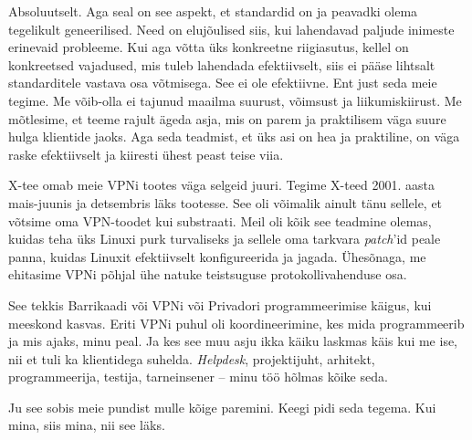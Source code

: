 
Absoluutselt. Aga seal on see aspekt, et standardid on ja peavadki olema 
tegelikult geneerilised. Need on elujõulised siis, kui lahendavad 
paljude inimeste erinevaid probleeme. Kui aga võtta üks konkreetne riigiasutus, kellel on konkreetsed vajadused, mis tuleb 
lahendada efektiivselt, siis ei pääse lihtsalt 
standarditele vastava osa võtmisega. See ei ole efektiivne. Ent
just seda meie tegime. Me 
võib-olla ei tajunud maailma suurust, võimsust ja liikumiskiirust. 
Me mõtlesime, et teeme rajult 
ägeda asja, mis on parem ja praktilisem väga suure 
hulga klientide jaoks. Aga seda teadmist, et üks asi on hea ja praktiline,  
on väga raske efektiivselt ja kiiresti ühest peast teise viia.  


X-tee omab meie VPNi tootes väga selgeid 
juuri. Tegime X-teed 2001. aasta mais-juunis ja detsembris läks tootesse. 
See oli võimalik ainult tänu sellele, et võtsime oma VPN-toodet kui 
substraati. Meil oli kõik see teadmine olemas, kuidas teha üks Linuxi purk 
turvaliseks ja sellele oma tarkvara 
\emph{patch}'id peale panna, kuidas Linuxit efektiivselt konfigureerida ja jagada. Ühesõnaga, me ehitasime VPNi põhjal ühe natuke teistsuguse 
protokollivahenduse osa. 


See tekkis Barrikaadi või VPNi või Privadori 
programmeerimise käigus, kui meeskond kasvas. Eriti VPNi puhul oli
koordineerimine, kes mida programmeerib ja mis ajaks, minu peal. Ja kes see muu asju ikka käiku laskmas käis kui me 
ise, nii et tuli ka klientidega suhelda. \emph{Helpdesk}, 
projektijuht, arhitekt, programmeerija, testija, tarneinsener -- minu töö hõlmas kõike seda. 


Ju see sobis meie pundist mulle kõige paremini. Keegi pidi seda tegema. Kui mina, siis mina, nii see läks.

